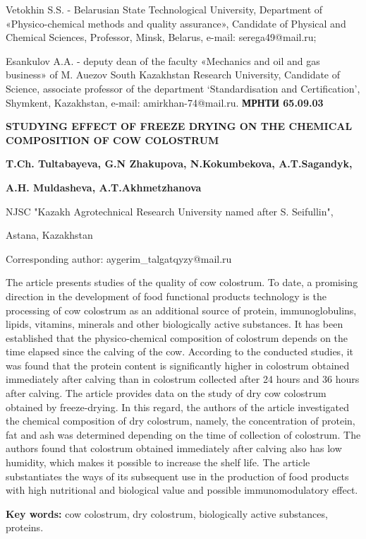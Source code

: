 Vetokhin S.S. - Belarusian State Technological University, Department of
«Physico-chemical methods and quality assurance», Candidate of Physical
and Chemical Sciences, Professor, Minsk, Belarus, e-mail:
serega49@mail.ru;

Esankulov A.A. - deputy dean of the faculty «Mechanics and oil and gas
business» of M. Auezov South Kazakhstan Research University, Candidate
of Science, associate professor of the department `Standardisation and
Certification', Shymkent, Kazakhstan, e-mail: amirkhan-74@mail.ru.\newpage
{\bfseries МРНТИ 65.09.03}

{\bfseries STUDYING EFFECT OF FREEZE DRYING ON THE CHEMICAL COMPOSITION OF
COW COLOSTRUM}

{\bfseries T.Ch. Tultabayeva, G.N Zhakupova, N.Kokumbekova, A.T.Sagandyk,}

{\bfseries A.H. Muldasheva, A.T.Akhmetzhanova}

NJSC "Kazakh Agrotechnical Research University named after S.
Seifullin",

Astana, Kazakhstan

Corresponding author: aygerim\_talgatqyzy@mail.ru

The article presents studies of the quality of cow colostrum. To date, a
promising direction in the development of food functional products
technology is the processing of cow colostrum as an additional source of
protein, immunoglobulins, lipids, vitamins, minerals and other
biologically active substances. It has been established that the
physico-chemical composition of colostrum depends on the time elapsed
since the calving of the cow. According to the conducted studies, it was
found that the protein content is significantly higher in colostrum
obtained immediately after calving than in colostrum collected after 24
hours and 36 hours after calving. The article provides data on the study
of dry cow colostrum obtained by freeze-drying. In this regard, the
authors of the article investigated the chemical composition of dry
colostrum, namely, the concentration of protein, fat and ash was
determined depending on the time of collection of colostrum. The authors
found that colostrum obtained immediately after calving also has low
humidity, which makes it possible to increase the shelf life. The
article substantiates the ways of its subsequent use in the production
of food products with high nutritional and biological value and possible
immunomodulatory effect.

{\bfseries Key words:} cow colostrum, dry colostrum, biologically active
substances, proteins.

